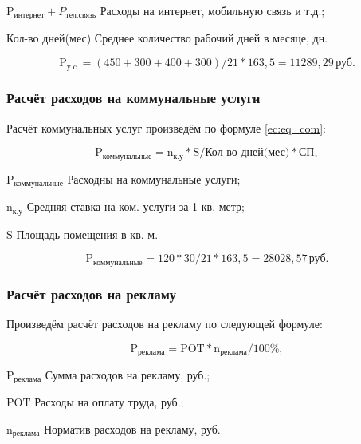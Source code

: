 \begin{eqexpl}[18ex]
    \item{$\text{P}_\text{интернет} + P_\text{тел.связь}$} Расходы на интернет, мобильную связь и т.д.;
    \item{Кол-во дней(мес)} Среднее количество рабочий дней в месяце, дн.
\end{eqexpl}

\begin{equation*}
    \text{P}_\text{y.c.} = (450 + 300 + 400 + 300) / 21 * 163,5 = 11289,29 \, \text{руб}.
\end{equation*}

\subsubsection{Расчёт расходов на коммунальные услуги}

Расчёт коммунальных услуг произведём по формуле \ref{ec:eq_com}:

\begin{equation}
    \label{ec:eq_com}
    \text{P}_\text{коммунальные} = \text{n}_\text{к.у} * \text{S} / \text{Кол-во дней(мес)} * \text{СП},
\end{equation}

\begin{eqexpl}[12ex]
    \item{$\text{P}_\text{коммунальные}$} Расходны на коммунальные услуги;
    \item{$\text{n}_\text{к.у}$} Средняя ставка на ком. услуги за 1 кв. метр;
    \item{$\text{S}$} Площадь помещения в кв. м.
\end{eqexpl}

\begin{equation*}
    \text{P}_\text{коммунальные} = 120 * 30 / 21 * 163,5 = 28028,57 \, \text{руб}.
\end{equation*}

\subsubsection{Расчёт расходов на рекламу}

Произведём расчёт расходов на рекламу по следующей формуле:

\begin{equation}
    \text{P}_\text{реклама} = \text{POT} * \text{n}_\text{реклама} / 100\%,
\end{equation}

\begin{eqexpl}[7ex]
    \item{$\text{P}_\text{реклама}$} Сумма расходов на рекламу, руб.;
    \item{$\text{POT}$} Расходы на оплату труда, руб.;
    \item{$\text{n}_\text{реклама}$} Норматив расходов на рекламу, руб.
\end{eqexpl}

